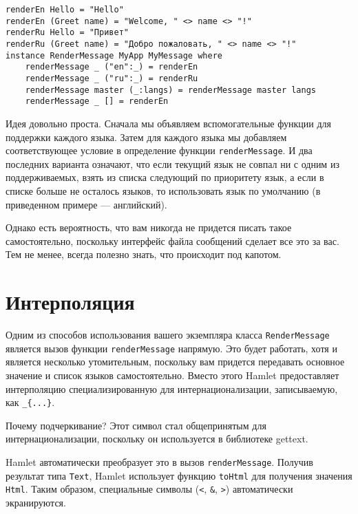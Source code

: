 \begin{lstlisting}
renderEn Hello = "Hello"
renderEn (Greet name) = "Welcome, " <> name <> "!"
renderRu Hello = "Привет"
renderRu (Greet name) = "Добро пожаловать, " <> name <> "!"
instance RenderMessage MyApp MyMessage where
    renderMessage _ ("en":_) = renderEn
    renderMessage _ ("ru":_) = renderRu
    renderMessage master (_:langs) = renderMessage master langs
    renderMessage _ [] = renderEn
\end{lstlisting}

Идея довольно проста. Сначала мы объявляем вспомогательные функции для поддержки каждого языка. Затем для каждого языка мы добавляем соответствующее условие в определение функции \lstinline'renderMessage'. И два последних варианта означают, что если текущий язык не совпал ни с одним из поддерживаемых, взять из списка следующий по приоритету язык, а если в списке больше не осталось языков, то использовать язык по умолчанию (в приведенном примере --- английский).

Однако есть вероятность, что вам никогда не придется писать такое самостоятельно, поскольку интерфейс файла сообщений сделает все это за вас. Тем не менее, всегда полезно знать, что происходит под капотом.

\section{Интерполяция} %

Одним из способов использования вашего экземпляра класса \lstinline'RenderMessage' является вызов функции \lstinline'renderMessage' напрямую. Это будет работать, хотя и является несколько утомительным, поскольку вам придется передавать основное значение и список языков самостоятельно. Вместо этого Hamlet предоставляет интерполяцию специализированную для интернационализации, записываемую, как \lstinline'_{...}'.

\begin{remark}
Почему подчеркивание? Этот символ стал общепринятым для интернационализации, поскольку он используется в библиотеке gettext.
\end{remark}

Hamlet автоматически преобразует это в вызов \lstinline'renderMessage'. Получив результат типа \lstinline'Text', Hamlet использует функцию \lstinline'toHtml' для получения значения \lstinline'Html'. Таким образом, специальные символы (\verb'<', \verb'&', \verb'>') автоматически экранируются.

